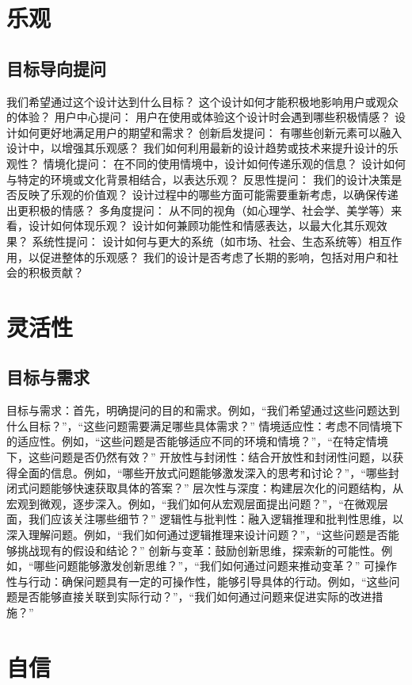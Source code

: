 \documentclass[12pt]{book}
\begin{document}
\section{乐观}
\subsection{目标导向提问}
我们希望通过这个设计达到什么目标？
这个设计如何才能积极地影响用户或观众的体验？
用户中心提问：
用户在使用或体验这个设计时会遇到哪些积极情感？
设计如何更好地满足用户的期望和需求？
创新启发提问：
有哪些创新元素可以融入设计中，以增强其乐观感？
我们如何利用最新的设计趋势或技术来提升设计的乐观性？
情境化提问：
在不同的使用情境中，设计如何传递乐观的信息？
设计如何与特定的环境或文化背景相结合，以表达乐观？
反思性提问：
我们的设计决策是否反映了乐观的价值观？
设计过程中的哪些方面可能需要重新考虑，以确保传递出更积极的情感？
多角度提问：
从不同的视角（如心理学、社会学、美学等）来看，设计如何体现乐观？
设计如何兼顾功能性和情感表达，以最大化其乐观效果？
系统性提问：
设计如何与更大的系统（如市场、社会、生态系统等）相互作用，以促进整体的乐观感？
我们的设计是否考虑了长期的影响，包括对用户和社会的积极贡献？

\section{灵活性}
\subsection{目标与需求}
目标与需求：首先，明确提问的目的和需求。例如，“我们希望通过这些问题达到什么目标？”，“这些问题需要满足哪些具体需求？”
情境适应性：考虑不同情境下的适应性。例如，“这些问题是否能够适应不同的环境和情境？”，“在特定情境下，这些问题是否仍然有效？”
开放性与封闭性：结合开放性和封闭性问题，以获得全面的信息。例如，“哪些开放式问题能够激发深入的思考和讨论？”，“哪些封闭式问题能够快速获取具体的答案？”
层次性与深度：构建层次化的问题结构，从宏观到微观，逐步深入。例如，“我们如何从宏观层面提出问题？”，“在微观层面，我们应该关注哪些细节？”
逻辑性与批判性：融入逻辑推理和批判性思维，以深入理解问题。例如，“我们如何通过逻辑推理来设计问题？”，“这些问题是否能够挑战现有的假设和结论？”
创新与变革：鼓励创新思维，探索新的可能性。例如，“哪些问题能够激发创新思维？”，“我们如何通过问题来推动变革？”
可操作性与行动：确保问题具有一定的可操作性，能够引导具体的行动。例如，“这些问题是否能够直接关联到实际行动？”，“我们如何通过问题来促进实际的改进措施？”



\section{自信}
\end{document}
